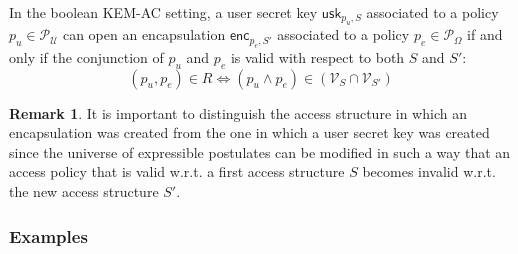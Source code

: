 \documentclass[a4paper]{article}
\theoremstyle{definition}
\newtheorem*{remark}{Remark}
\newcommand{\usk}[2]{\mathsf{usk}_{#1,#2}}
\newcommand{\enc}[2]{\mathsf{enc}_{#1,#2}}
\newcommand{\cP}{\mathcal{P}}
\newcommand{\cU}{\mathcal{U}}
\newcommand{\cV}{\mathcal{V}}
\begin{document}
In the boolean KEM-AC setting, a  user secret key \(\usk{p_u}{S}\) associated to a
policy \(p_u \in \cP_\cU\) can open an encapsulation \(\enc{p_e}{S'}\) associated to
a policy \(p_e \in \cP_\Omega\) if and  only if the conjunction of \(p_u\) and \(p_e\)
is valid with respect to both \(S\) and  \(S'\): \[ (p_u, p_e) \in R \iff (p_u \land
p_e) \in (\cV_S \cap \cV_{S'})\]

\begin{remark}
It is  important to distinguish the  access structure in which  an encapsulation
was  created from  the one  in which  a user  secret key  was created  since the
universe of expressible postulates can be modified  in such a way that an access
policy that is valid w.r.t.  a first access structure \(S\) becomes invalid w.r.t.
the new access structure \(S'\).
\end{remark}
\subsubsection{Examples}
\label{sec:org6a8b19c}
\end{document}
